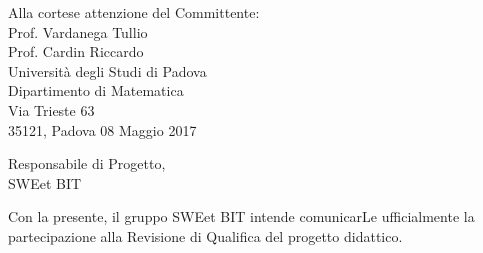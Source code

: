 \begin{minipage}{0.7\textwidth}
	\begin{flushright}
		Alla cortese attenzione del Committente: \\
		Prof. Vardanega Tullio \\
		Prof. Cardin Riccardo \\
		Università degli Studi di Padova \\
		Dipartimento di Matematica \\
		Via Trieste 63\\
		35121, Padova
		\vspace{5mm} 08 Maggio 2017
	\end{flushright}
\end{minipage}

\begin{minipage}{\textwidth}
	\begin{flushleft}
		Responsabile di Progetto,\\
		SWEet BIT\\
	\end{flushleft}
\end{minipage}

\vspace{5mm}Con la presente, il gruppo SWEet BIT intende comunicarLe ufficialmente la partecipazione
alla Revisione di Qualifica del progetto didattico.

